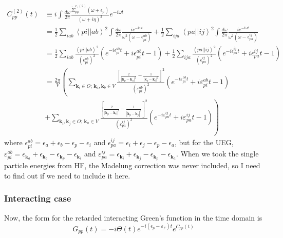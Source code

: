 \begin{align}
C_{pp}^{(2)}(t) &\equiv i \int \frac{d\omega}{2\pi} \frac{ \tilde{\Sigma}_{pp}^{c,(2)}\left(\omega+\epsilon_p\right)}{(\omega + i \eta)^2} e^{-i \omega t} \\
 &= \frac{1}{2} \sum_{iab} \left< pi \left| \right| ab \right>^2 \int \frac{d\omega}{2\pi} \frac{i e^{-i \omega t}}{\omega^2\left(\omega-\epsilon_{pi}^{ab}\right)} + \frac{1}{2} \sum_{ija} \left< pa \left| \right| ij \right>^2 \int \frac{d\omega}{2\pi} \frac{i e^{-i \omega t}}{\omega^2\left(\omega-\epsilon_{pa}^{ij}\right)} \\
&= \frac{1}{2}\sum_{iab} \frac{\left< pi \left| \right| ab \right>^2}{\left(\epsilon_{pi}^{ab}\right)^2}
\left(e^{-i \epsilon_{pi}^{ab} t} +i \epsilon_{pi}^{ab} t -1 \right)
+\frac{1}{2}\sum_{ija} \frac{\left< pa \left| \right| ij \right>^2}{\left(\epsilon_{pa}^{ij}\right)^2}
\left(e^{-i \epsilon_{pa}^{ij} t} +i \epsilon_{pa}^{ij} t -1 \right) \\
&= \frac{2\pi}{V} \left( \sum_{\mathbf{k}_i \in O; \,\mathbf{k}_a , \mathbf{k}_b \in V} \frac{\left[ \frac{2}{|\mathbf{k}_p - \mathbf{k}_a|^2} - \frac{1}{|\mathbf{k}_p - \mathbf{k}_b|^2} \right]^2 }{\left(\varepsilon_{pi}^{ab}\right)^2}
\left(e^{-i \varepsilon_{pi}^{ab} t} +i \varepsilon_{pi}^{ab} t -1 \right) \right. \\
& \left. + \sum_{\mathbf{k}_i,\mathbf{k}_j \in O;\, \mathbf{k}_a \in V} \frac{\left[ \frac{2}{|\mathbf{k}_p-\mathbf{k}_i|^2} - \frac{1}{|\mathbf{k}_p - \mathbf{k}_j|^2} \right]^2 }{\left(\varepsilon_{pa}^{ij}\right)^2}
\left(e^{-i \varepsilon_{pa}^{ij} t} +i \varepsilon_{pa}^{ij} t -1 \right) \right)
\label{eq:cumulant_2nd_final}
\end{align}
where
$\epsilon_{pi}^{ab} = \epsilon_{a}+\epsilon_{b}-\epsilon_{p}-\epsilon_{i}$
and
$\epsilon_{pa}^{ij} = \epsilon_{i}+\epsilon_{j}-\epsilon_{p}-\epsilon_{a}$, but for the UEG, $\varepsilon_{pi}^{ab} = \epsilon_{\mathbf{k}_a} + \epsilon_{\mathbf{k}_b} - \epsilon_{\mathbf{k}_p} - \epsilon_{\mathbf{k}_i}$ and $\varepsilon_{pa}^{ij} = \epsilon_{\mathbf{k}_i} + \epsilon_{\mathbf{k}_j} - \epsilon_{\mathbf{k}_p} - \epsilon_{\mathbf{k}_a}$. When we took the single particle energies from HF, the Madelung correction was never included, so I need to find out if we need to include it here.
\subsubsection{Interacting case}
Now, the form for the retarded interacting Green's function in the time domain is
\begin{equation}
    G_{pp}(t) = -i \Theta(t) e^{-i \left(\epsilon_p - \varepsilon_F \right)t} e^{C_{pp}(t)}
\end{equation}
